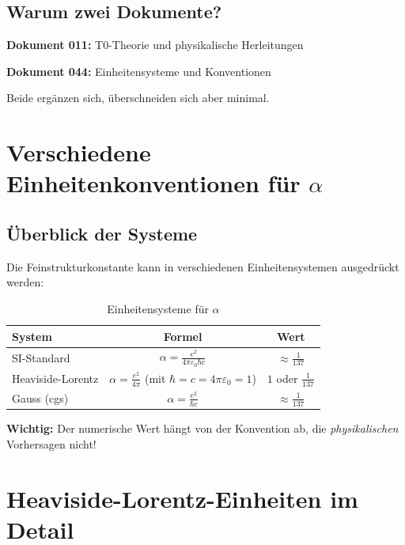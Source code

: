 	\subsection{Warum zwei Dokumente?}
	
	\textbf{Dokument 011:} T0-Theorie und physikalische Herleitungen
	
	\textbf{Dokument 044:} Einheitensysteme und Konventionen
	
	Beide ergänzen sich, überschneiden sich aber minimal.
	
	\section{Verschiedene Einheitenkonventionen für $\alpha$}
	
	\subsection{Überblick der Systeme}
	
	Die Feinstrukturkonstante kann in verschiedenen Einheitensystemen ausgedrückt werden:
	
	\begin{table}[h]
		\centering
		\begin{tabular}{|l|c|c|}
			\hline
			\textbf{System} & \textbf{Formel} & \textbf{Wert} \\
			\hline
			SI-Standard & $\alpha = \frac{e^2}{4\pi\varepsilon_0\hbar c}$ & $\approx \frac{1}{137}$ \\
			Heaviside-Lorentz & $\alpha = \frac{e^2}{4\pi}$ (mit $\hbar = c = 4\pi\varepsilon_0 = 1$) & $1$ oder $\frac{1}{137}$ \\
			Gauss (cgs) & $\alpha = \frac{e^2}{\hbar c}$ & $\approx \frac{1}{137}$ \\
			\hline
		\end{tabular}
		\caption{Einheitensysteme für $\alpha$}
	\end{table}
	
	\textbf{Wichtig:} Der numerische Wert hängt von der Konvention ab, die \textit{physikalischen} Vorhersagen nicht!
	
	\section[Heaviside-Lorentz-Einheiten im Detail]{Heaviside-Lorentz-Einheiten im Detail}
	
